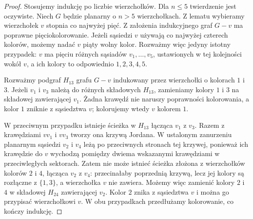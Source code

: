 \begin{proof}
Stosujemy indukcję po liczbie wierzchołków. Dla
$n\le5$ twierdzenie jest oczywiste. Niech $G$
będzie planarny o $n>5$ wierzchołkach. Z lematu wybieramy
wierzchołek $v$ stopnia co najwyżej pięć. Z założenia
indukcyjnego graf $G-v$ ma poprawne pięciokolorowanie.
Jeżeli sąsiedzi $v$ używają co najwyżej czterech kolorów,
możemy nadać $v$ piąty wolny kolor. Rozważmy więc
jedyny istotny przypadek: $v$ ma pięciu różnych sąsiadów
$v_1,\ldots,v_5$, ustawionych w tej kolejności wokół $v$,
a ich kolory to odpowiednio $1,2,3,4,5$.

Rozważmy podgraf $H_{13}$ grafu $G-v$ indukowany przez
wierzchołki o kolorach $1$ i $3$. Jeżeli $v_1$ i $v_3$
należą do różnych składowych $H_{13}$, zamieniamy
kolory $1$ i $3$ na składowej zawierającej $v_1$.
Żadna krawędź nie naruszy poprawności kolorowania,
a kolor $1$ zniknie z sąsiedztwa $v$; kolorujemy wtedy
$v$ kolorem $1$.

W przeciwnym przypadku istnieje ścieżka w $H_{13}$
łącząca $v_1$ z $v_3$. Razem z krawędziami
$vv_1$ i $vv_3$ tworzy ona krzywą Jordana.
W ustalonym zanurzeniu planarnym sąsiedzi $v_2$ i $v_4$
leżą po przeciwnych stronach tej krzywej, ponieważ
ich krawędzie do $v$ wychodzą pomiędzy dwiema wskazanymi
krawędziami w przeciwległych sektorach.
Zatem nie może istnieć ścieżka złożona z wierzchołków
kolorów $2$ i $4$, łącząca $v_2$ z $v_4$:
przecinałaby poprzednią krzywą, lecz jej kolory są
rozłączne z $\{1,3\}$, a wierzchołka $v$ nie zawiera.
Możemy więc zamienić kolory $2$ i $4$ w składowej
$H_{24}$ zawierającej $v_2$. Kolor $2$ znika
z sąsiedztwa $v$ i można go przypisać wierzchołkowi $v$.
W obu przypadkach przedłużamy kolorowanie, co kończy indukcję.
\end{proof}

\begin{center}
\end{center}

